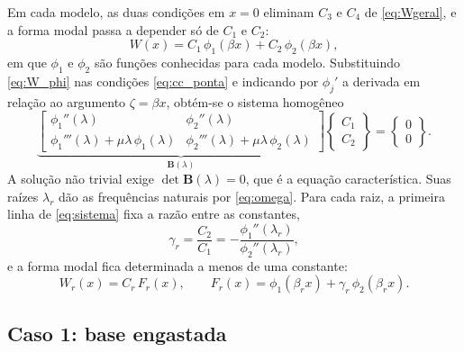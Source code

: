 Em cada modelo, as duas condições em $x = 0$ eliminam $C_3$ e $C_4$ de
\eqref{eq:Wgeral}, e a forma modal passa a depender só de $C_1$ e $C_2$:
\begin{equation}
    W(x) = C_1\,\phi_1(\beta x) + C_2\,\phi_2(\beta x),
    \label{eq:W_phi}
\end{equation}
em que $\phi_1$ e $\phi_2$ são funções conhecidas para cada modelo. Substituindo
\eqref{eq:W_phi} nas condições \eqref{eq:cc_ponta} e indicando por $\phi_j'$ a derivada
em relação ao argumento $\zeta = \beta x$, obtém-se o sistema homogêneo
\begin{equation}
    \underbrace{\begin{bmatrix}
            \phi_1''(\lambda)                                & \phi_2''(\lambda) \\[2pt]
            \phi_1'''(\lambda) + \mu\lambda\,\phi_1(\lambda) &
            \phi_2'''(\lambda) + \mu\lambda\,\phi_2(\lambda)
        \end{bmatrix}}_{\mathbf{B}(\lambda)}
    \begin{Bmatrix} C_1 \\ C_2 \end{Bmatrix}
    = \begin{Bmatrix} 0 \\ 0 \end{Bmatrix}.
    \label{eq:sistema}
\end{equation}
A solução não trivial exige $\det\mathbf{B}(\lambda) = 0$, que é a
equação característica. Suas raízes $\lambda_r$ dão as frequências naturais por
\eqref{eq:omega}. Para cada raiz, a primeira linha de \eqref{eq:sistema} fixa a razão
entre as constantes,
\begin{equation}
    \gamma_r = \frac{C_2}{C_1} = -\frac{\phi_1''(\lambda_r)}{\phi_2''(\lambda_r)},
    \label{eq:gamma}
\end{equation}
e a forma modal fica determinada a menos de uma constante:
\begin{equation}
    W_r(x) = C_r\,F_r(x), \qquad
    F_r(x) = \phi_1(\beta_r x) + \gamma_r\,\phi_2(\beta_r x).
    \label{eq:Fr}
\end{equation}



\subsection{Caso 1: base engastada}
\label{sec:engaste}

